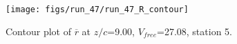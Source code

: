 \begin{figure}[H]
\centering
\texttt{[image: figs/run\_47/run\_47\_R\_contour]}
\caption{Contour plot of $\overline{r}$ at $z/c$=9.00, $V_{free}$=27.08, station 5.}
\label{fig:run_47_R_contour}
\end{figure}


